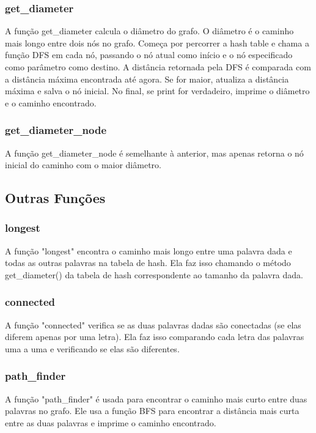 \documentclass[a4paper,11pt]{article}
\begin{document}
    \subsubsection{get\_diameter}
    A função get\_diameter calcula o diâmetro do grafo. O diâmetro é o caminho mais longo entre dois nós no grafo. Começa por percorrer a hash table e chama a função DFS em cada nó, passando o nó atual como início e o nó especificado como parâmetro como destino. A distância retornada pela DFS é comparada com a distância máxima encontrada até agora. Se for maior, atualiza a distância máxima e salva o nó inicial. No final, se print for verdadeiro, imprime o diâmetro e o caminho encontrado.
    
    \subsubsection{get\_diameter\_node}
    A função get\_diameter\_node é semelhante à anterior, mas apenas retorna o nó inicial do caminho com o maior diâmetro.
    

    \subsection{Outras Funções}\label{subsec:outras-funcoes}

    \subsubsection{longest}
    A função "longest" encontra o caminho mais longo entre uma palavra dada e todas as outras palavras na tabela de hash. Ela faz isso chamando o método get\_diameter() da tabela de hash correspondente ao tamanho da palavra dada.
    
    \subsubsection{connected}
    A função "connected" verifica se as duas palavras dadas são conectadas (se elas diferem apenas por uma letra). Ela faz isso comparando cada letra das palavras uma a uma e verificando se elas são diferentes.
    
    \subsubsection{path\_finder}
    A função "path\_finder" é usada para encontrar o caminho mais curto entre duas palavras no grafo. Ele usa a função BFS para encontrar a distância mais curta entre as duas palavras e imprime o caminho encontrado.
    
\end{document}
